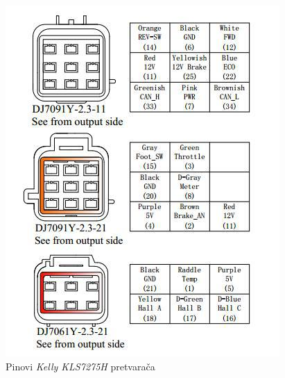 \begin{figure}[]
\begin{center}
\includegraphics[scale=1]{slike/kellypins.jpg}
\end{center}
\caption{Pinovi \textit{Kelly KLS7275H} pretvarača}
\label{fig:kellypins}
\end{figure}










